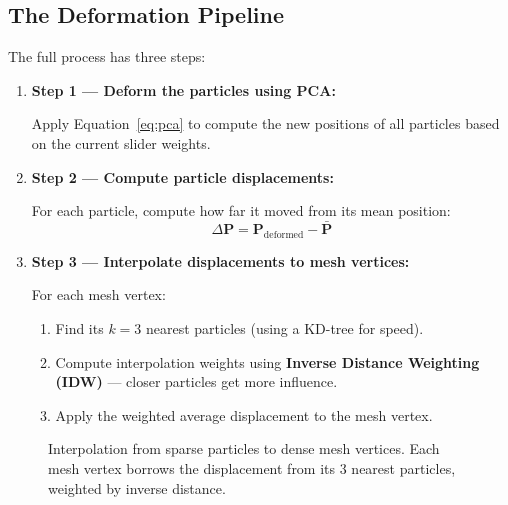\documentclass[12pt,a4paper]{article}
\begin{document}
\subsection{The Deformation Pipeline}

The full process has three steps:

\begin{enumerate}[itemsep=1em]
    \item \textbf{Step 1 --- Deform the particles using PCA:}

    Apply Equation~\ref{eq:pca} to compute the new positions of all particles based on the current slider weights.

    \item \textbf{Step 2 --- Compute particle displacements:}

    For each particle, compute how far it moved from its mean position:
    \[
    \Delta \mathbf{P} = \mathbf{P}_{\text{deformed}} - \bar{\mathbf{P}}
    \]

    \item \textbf{Step 3 --- Interpolate displacements to mesh vertices:}

    For each mesh vertex:
    \begin{enumerate}[label=(\alph*)]
        \item Find its $k = 3$ nearest particles (using a KD-tree for speed).
        \item Compute interpolation weights using \textbf{Inverse Distance Weighting (IDW)} --- closer particles get more influence.
        \item Apply the weighted average displacement to the mesh vertex.
    \end{enumerate}
\end{enumerate}

\begin{figure}[H]
    \centering
    \caption{Interpolation from sparse particles to dense mesh vertices. Each mesh vertex borrows the displacement from its 3 nearest particles, weighted by inverse distance.}
    \label{fig:interpolation}
\end{figure}
\end{document}
